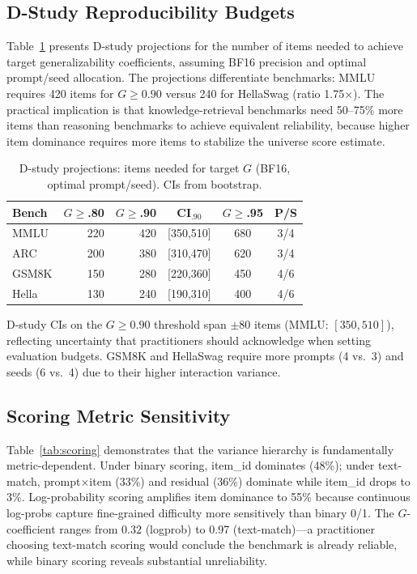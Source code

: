 \documentclass[11pt,twocolumn]{article}
\begin{document}
\subsection{D-Study Reproducibility Budgets}
\label{sec:dstudy}

Table~\ref{tab:dstudy} presents D-study projections for the number of items needed to achieve target generalizability coefficients, assuming BF16 precision and optimal prompt/seed allocation. The projections differentiate benchmarks: MMLU requires 420 items for $G\geq0.90$ versus 240 for HellaSwag (ratio 1.75$\times$). The practical implication is that knowledge-retrieval benchmarks need 50--75\% more items than reasoning benchmarks to achieve equivalent reliability, because higher item dominance requires more items to stabilize the universe score estimate.

\begin{table}[t]
\centering
\caption{D-study projections: items needed for target $G$ (BF16, optimal prompt/seed). CIs from bootstrap.}
\label{tab:dstudy}
\small
\begin{tabular}{@{}lrrccc@{}}
\toprule
Bench & $G$\scriptsize{$\geq$.80} & $G$\scriptsize{$\geq$.90} & CI\scriptsize{$_{.90}$} & $G$\scriptsize{$\geq$.95} & P/S \\
\midrule
MMLU & 220 & 420 & [350,510] & 680 & 3/4 \\
ARC & 200 & 380 & [310,470] & 620 & 3/4 \\
GSM8K & 150 & 280 & [220,360] & 450 & 4/6 \\
Hella & 130 & 240 & [190,310] & 400 & 4/6 \\
\bottomrule
\end{tabular}
\end{table}

D-study CIs on the $G\geq0.90$ threshold span $\pm$80 items (MMLU: $[350, 510]$), reflecting uncertainty that practitioners should acknowledge when setting evaluation budgets. GSM8K and HellaSwag require more prompts (4 vs.\ 3) and seeds (6 vs.\ 4) due to their higher interaction variance.

\subsection{Scoring Metric Sensitivity}
\label{sec:metrics}

Table~\ref{tab:scoring} demonstrates that the variance hierarchy is fundamentally metric-dependent. Under binary scoring, item\_id dominates (48\%); under text-match, prompt$\times$item (33\%) and residual (36\%) dominate while item\_id drops to 3\%. Log-probability scoring amplifies item dominance to 55\% because continuous log-probs capture fine-grained difficulty more sensitively than binary 0/1. The $G$-coefficient ranges from 0.32 (logprob) to 0.97 (text-match)---a practitioner choosing text-match scoring would conclude the benchmark is already reliable, while binary scoring reveals substantial unreliability.
\end{document}

